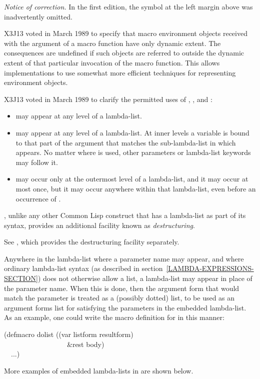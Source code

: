\begin{defmac}
\begin{new}%
\emph{Notice of correction.}
In the first edition, the symbol  at the
left margin above was inadvertently omitted.
\end{new}

\begin{newer}
X3J13 voted in March 1989 
to specify that macro environment objects received with the 
argument of a macro function
have only dynamic extent.  The consequences are undefined if such objects are
referred to outside the dynamic extent of that particular
invocation of the macro function.
This allows implementations to use somewhat more efficient techniques
for representing environment objects. 
\end{newer}

\begin{newer}
X3J13 voted in March 1989  to clarify the permitted
uses of , , and :
\begin{itemize}
\item {} may appear at any level of a  lambda-list.
\item {} may appear at any level of a  lambda-list.
At inner levels a  variable is bound to that part of the argument
that matches the sub-lambda-list in which  appears.  No matter where
 is used, other parameters or lambda-list keywords may follow it.
\item {} may occur only at the outermost level of a 
lambda-list, and it may occur at most once, but it may occur anywhere within
that lambda-list, even before an occurrence of .
\end{itemize}
\end{newer}

, unlike any other Common Lisp construct that has a lambda-list
as part of its syntax, provides an additional facility known as
\emph{destructuring}.
\begin{newer}
See , which provides the destructuring facility separately.
\end{newer}
Anywhere in the lambda-list where a parameter
name may appear, and where ordinary lambda-list syntax (as described
in section~\ref{LAMBDA-EXPRESSIONS-SECTION}) does not
otherwise allow a list, a lambda-list may appear in place
of the parameter name.  When this is done, then the argument form
that would match the parameter is treated as a (possibly dotted) list,
to be used as an argument forms list for satisfying the
parameters in the embedded lambda-list.
As an example, one could write the macro definition
for  in this manner:
\begin{lisp}
(defmacro dolist ((var listform  resultform) \\
~~~~~~~~~~~~~~~~~~\&rest body) \\
~~...)
\end{lisp}
More examples of embedded lambda-lists in  are shown below.


\end{defmac}
